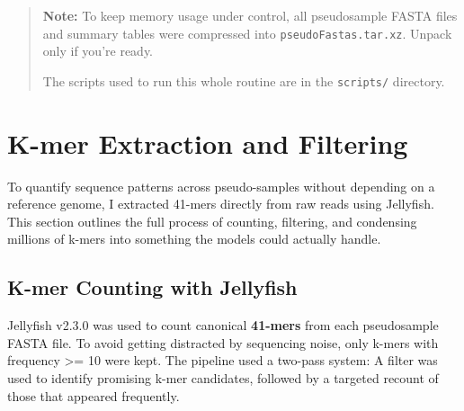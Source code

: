 \documentclass[
]{book}
\begin{document}
\begin{quote}
\textbf{Note:} To keep memory usage under control, all pseudosample FASTA files and summary tables were compressed into \texttt{pseudoFastas.tar.xz}. Unpack only if you're ready.

The scripts used to run this whole routine are in the \texttt{scripts/} directory.
\end{quote}

\hypertarget{k-mer-extraction-and-filtering}{%
\chapter{K-mer Extraction and Filtering}\label{k-mer-extraction-and-filtering}}

To quantify sequence patterns across pseudo-samples without depending on a reference genome, I extracted 41-mers directly from raw reads using Jellyfish. This section outlines the full process of counting, filtering, and condensing millions of k-mers into something the models could actually handle.

\hypertarget{k-mer-counting-with-jellyfish}{%
\section{K-mer Counting with Jellyfish}\label{k-mer-counting-with-jellyfish}}

Jellyfish v2.3.0 was used to count canonical \textbf{41-mers} from each pseudosample FASTA file. To avoid getting distracted by sequencing noise, only k-mers with frequency \textgreater= 10 were kept. The pipeline used a two-pass system: A filter was used to identify promising k-mer candidates, followed by a targeted recount of those that appeared frequently.
\end{document}
